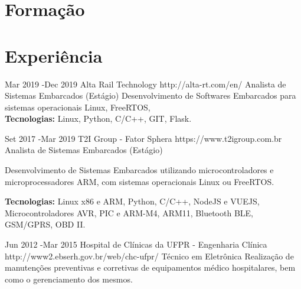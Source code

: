 \documentclass[10pt]{article} %
\begin{document}

\section{Formação}



\section{Experiência}

\job
{Mar 2019 -}{Dec 2019}
{Alta Rail Technology}
{http://alta-rt.com/en/}
{Analista de Sistemas Embarcados (Estágio)}
{{Desenvolvimento de Softwares Embarcados para sistemas operacionais Linux, FreeRTOS,}\\\textbf{Tecnologias:} Linux, Python, C/C++, GIT, Flask.}


\job
{Set 2017 -}{Mar 2019}
{T2I Group - Fator Sphera}
{https://www.t2igroup.com.br}
{Analista de Sistemas Embarcados (Estágio)}
{{Desenvolvimento de Sistemas Embarcados utilizando microcontroladores e microprocessadores ARM, com sistemas operacionais Linux ou FreeRTOS.}\\
\rule{0mm}{5mm}\textbf{Tecnologias:} Linux x86 e ARM, Python, C/C++, NodeJS e VUEJS,  Microcontroladores AVR, PIC e ARM-M4, ARM11, Bluetooth BLE, GSM/GPRS, OBD II.}

\job
{Jun 2012 -}{Mar 2015}
{Hospital de Clínicas da UFPR - Engenharia Clínica}
{http://www2.ebserh.gov.br/web/chc-ufpr/}
{Técnico em Eletrônica}
{Realização de manutenções preventivas e corretivas de equipamentos médico hospitalares, bem como o gerenciamento dos mesmos.}
\end{document}
